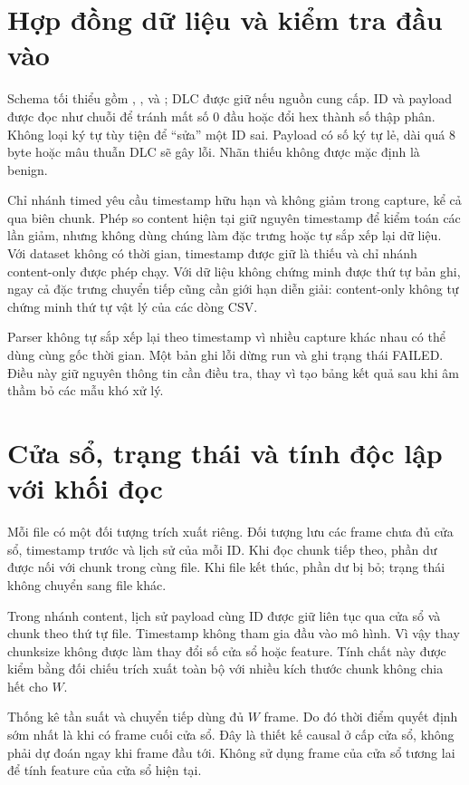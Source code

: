 \documentclass[12pt,a4paper,oneside,openany]{extbook}
\DeclareRobustCommand{\code}[1]{\texttt{\detokenize{#1}}}
\begin{document}
\section{Hợp đồng dữ liệu và kiểm tra đầu vào}
Schema tối thiểu gồm \code{timestamp}, \code{arbitration_id}, \code{data_field} và \code{attack}; DLC được giữ nếu nguồn cung cấp. ID và payload được đọc như chuỗi để tránh mất số 0 đầu hoặc đổi hex thành số thập phân. Không loại ký tự tùy tiện để ``sửa'' một ID sai. Payload có số ký tự lẻ, dài quá 8 byte hoặc mâu thuẫn DLC sẽ gây lỗi. Nhãn thiếu không được mặc định là benign.

Chỉ nhánh timed yêu cầu timestamp hữu hạn và không giảm trong capture, kể cả qua biên chunk. Phép so content hiện tại giữ nguyên timestamp để kiểm toán các lần giảm, nhưng không dùng chúng làm đặc trưng hoặc tự sắp xếp lại dữ liệu. Với dataset không có thời gian, timestamp được giữ là thiếu và chỉ nhánh content-only được phép chạy. Với dữ liệu không chứng minh được thứ tự bản ghi, ngay cả đặc trưng chuyển tiếp cũng cần giới hạn diễn giải: content-only không tự chứng minh thứ tự vật lý của các dòng CSV.

Parser không tự sắp xếp lại theo timestamp vì nhiều capture khác nhau có thể dùng cùng gốc thời gian. Một bản ghi lỗi dừng run và ghi trạng thái FAILED. Điều này giữ nguyên thông tin cần điều tra, thay vì tạo bảng kết quả sau khi âm thầm bỏ các mẫu khó xử lý.

\section{Cửa sổ, trạng thái và tính độc lập với khối đọc}
Mỗi file có một đối tượng trích xuất riêng. Đối tượng lưu các frame chưa đủ cửa sổ, timestamp trước và lịch sử của mỗi ID. Khi đọc chunk tiếp theo, phần dư được nối với chunk trong cùng file. Khi file kết thúc, phần dư bị bỏ; trạng thái không chuyển sang file khác.

Trong nhánh content, lịch sử payload cùng ID được giữ liên tục qua cửa sổ và chunk theo thứ tự file. Timestamp không tham gia đầu vào mô hình. Vì vậy thay chunksize không được làm thay đổi số cửa sổ hoặc feature. Tính chất này được kiểm bằng đối chiếu trích xuất toàn bộ với nhiều kích thước chunk không chia hết cho $W$.

Thống kê tần suất và chuyển tiếp dùng đủ $W$ frame. Do đó thời điểm quyết định sớm nhất là khi có frame cuối cửa sổ. Đây là thiết kế causal ở cấp cửa sổ, không phải dự đoán ngay khi frame đầu tới. Không sử dụng frame của cửa sổ tương lai để tính feature của cửa sổ hiện tại.
\end{document}
